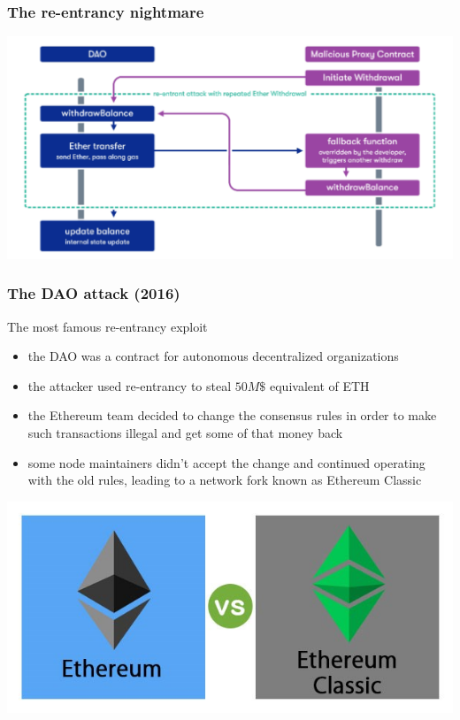 \documentclass[11pt]{beamer}  %
\begin{document}
\begin{frame}\frametitle{The re-entrancy nightmare}

  \begin{center}
    \includegraphics[width=\textwidth,clip=false]{pictures/re-entrancy.png}
  \end{center}

\end{frame}

\begin{frame}\frametitle{The DAO attack (2016)}

  \begin{greenbox}{The most famous re-entrancy exploit}
    \begin{itemize}
    \item the DAO was a contract for autonomous decentralized organizations
    \item the attacker used re-entrancy to steal $50M\$$ equivalent of ETH
    \item the Ethereum team decided to change the consensus rules in order
      to make such transactions illegal and get some of that money back
    \item some node maintainers didn't accept the change and continued
      operating with the old rules, leading to a network fork known as
      Ethereum Classic
    \end{itemize}
  \end{greenbox}

  \begin{center}
    \includegraphics[scale=0.5,clip=false]{pictures/ethereum-vs-ethereum-classic.jpg}
  \end{center}

\end{frame}
\end{document}
